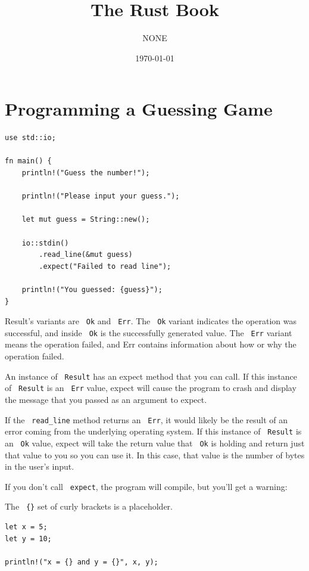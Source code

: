 \documentclass[11pt]{article}
\author{NONE}
\date{\today}
\title{The Rust Book}
\let\OldTexttt\texttt
\renewcommand{\texttt}[1]{\OldTexttt{\color{MidnightBlue} #1}}
\begin{document}
\maketitle
\tableofcontents


\section{Programming a Guessing Game}
\label{sec:orgcabb4a8}
\begin{verbatim}
use std::io;

fn main() {
    println!("Guess the number!");

    println!("Please input your guess.");

    let mut guess = String::new();

    io::stdin()
        .read_line(&mut guess)
        .expect("Failed to read line");

    println!("You guessed: {guess}");
}
\end{verbatim}

Result's variants are \texttt{Ok} and \texttt{Err}. The \texttt{Ok} variant indicates the operation was successful, and
inside \texttt{Ok} is the successfully generated value. The \texttt{Err} variant means the operation failed, and
Err contains information about how or why the operation failed.

An instance of \texttt{Result} has an expect method that you can call. If this instance of \texttt{Result} is an
\texttt{Err} value, expect will cause the program to crash and display the message that you passed as an
argument to expect.

If the \texttt{read\_line} method returns an \texttt{Err}, it would likely be the result of an error coming from
the underlying operating system. If this instance of \texttt{Result} is an \texttt{Ok} value, expect will take the
return value that \texttt{Ok} is holding and return just that value to you so you can use it. In this
case, that value is the number of bytes in the user’s input.

If you don’t call \texttt{expect}, the program will compile, but you’ll get a warning:

The \texttt{\{\}} set of curly brackets is a placeholder.

\begin{verbatim}
let x = 5;
let y = 10;

println!("x = {} and y = {}", x, y);
\end{verbatim}
\end{document}
